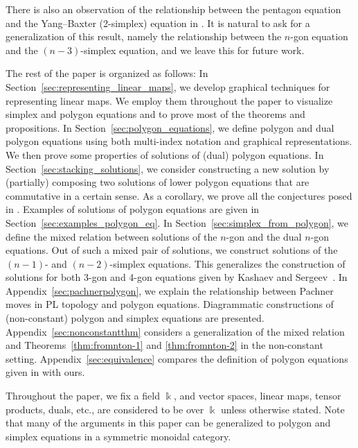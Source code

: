 \documentclass[pdftex]{sigma}
\numberwithin{equation}{section}
\theoremstyle{definition}
\begin{document}
There is also an observation of the relationship between the pentagon equation and the Yang--Baxter (2-simplex) equation in \cite{evripidou2024quadrirational, kashaev1995heisenberg,suzuki2018universal}. It is natural to ask for a generalization of this result, namely the relationship between the $n$-gon equation and the $(n-3)$-simplex equation, and we leave this for future work.

The rest of the paper is organized as follows: In Section~\ref{sec:representing_linear_maps}, we develop graphical techniques for representing linear maps. We employ them throughout the paper to visualize simplex and polygon equations and to prove most of the theorems and propositions. In Section~\ref{sec:polygon_equations}, we define polygon and dual polygon equations using both multi-index notation and graphical representations. We then prove some properties of solutions of (dual) polygon equations. In Section~\ref{sec:stacking_solutions}, we consider constructing a new solution by (partially) composing two solutions of lower polygon equations that are commutative in a certain sense. As a corollary, we prove all the conjectures posed in \cite{muller2024structure}. Examples of solutions of polygon equations are given in Section~\ref{sec:examples_polygon_eq}. In Section~\ref{sec:simplex_from_polygon}, we define the mixed relation between solutions of the $n$-gon and the dual $n$-gon equations. Out of such a mixed pair of solutions, we construct solutions of the $(n-1)$- and $(n-2)$-simplex equations. This generalizes the construction of solutions for both 3-gon and 4-gon equations given by Kashaev and Sergeev~\cite{kashaev1998pentagon}. In Appendix~\ref{sec:pachnerpolygon}, we explain the relationship between Pachner moves in PL topology and polygon equations. Diagrammatic constructions of (non-constant) polygon and simplex equations are presented. Appendix~\ref{sec:nonconstantthm} considers a generalization of the mixed relation and Theorems~\ref{thm:fromnton-1} and \ref{thm:fromnton-2} in the non-constant setting. Appendix~\ref{sec:equivalence} compares the definition of polygon equations given in \cite{dimakis2015simplex} with ours.

Throughout the paper, we fix a field $\Bbbk$, and vector spaces, linear maps, tensor products, duals, etc., are considered to be over $\Bbbk$ unless otherwise stated. Note that many of the arguments in this paper can be generalized to polygon and simplex equations in a symmetric monoidal category.
\end{document}
